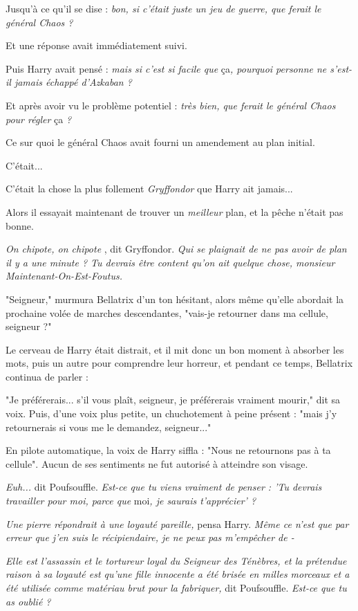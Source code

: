 Jusqu'à ce qu'il se dise : \emph{bon, si c'était juste un jeu de guerre, que ferait le général Chaos ?} 

Et une réponse avait immédiatement suivi.

Puis Harry avait pensé : \emph{mais si c'est si facile que } ça\emph{, pourquoi personne ne s'est-il jamais échappé d'Azkaban ?} 

Et après avoir vu le problème potentiel : \emph{très bien, que ferait le général Chaos pour régler } ça \emph{?} 

Ce sur quoi le général Chaos avait fourni un amendement au plan initial.

C'était...

C'était la chose la plus follement \emph{Gryffondor}  que Harry ait jamais...

Alors il essayait maintenant de trouver un \emph{meilleur}  plan, et la pêche n'était pas bonne.

\emph{On chipote, on chipote} , dit Gryffondor. \emph{Qui se plaignait de ne pas avoir de plan il y a une minute ? Tu devrais être content qu'on ait quelque chose, monsieur Maintenant-On-Est-Foutus.} 

"Seigneur," murmura Bellatrix d'un ton hésitant, alors même qu'elle abordait la prochaine volée de marches descendantes, "vais-je retourner dans ma cellule, seigneur ?"

Le cerveau de Harry était distrait, et il mit donc un bon moment à absorber les mots, puis un autre pour comprendre leur horreur, et pendant ce temps, Bellatrix continua de parler :

"Je préférerais... s'il vous plaît, seigneur, je préférerais vraiment mourir," dit sa voix. Puis, d'une voix plus petite, un chuchotement à peine présent : "mais j'y retournerais si vous me le demandez, seigneur..."

En pilote automatique, la voix de Harry siffla : "Nous ne retournons pas à ta cellule". Aucun de ses sentiments ne fut autorisé à atteindre son visage.

\emph{Euh...}  dit Poufsouffle. \emph{Est-ce que tu viens vraiment de penser : 'Tu devrais travailler pour moi, parce que } moi\emph{, je saurais t'apprécier' ?} 

\emph{Une pierre répondrait à une loyauté pareille, } pensa Harry. \emph{Même ce n'est que par erreur que j'en suis le récipiendaire, je ne peux pas m'empêcher de -} 

\emph{Elle est l'assassin et le tortureur loyal du Seigneur des Ténèbres, et la prétendue raison à sa loyauté est qu'une fille innocente a été brisée en milles morceaux et a été utilisée comme matériau brut pour la fabriquer, } dit Poufsouffle. \emph{Est-ce que tu as oublié ?} 

